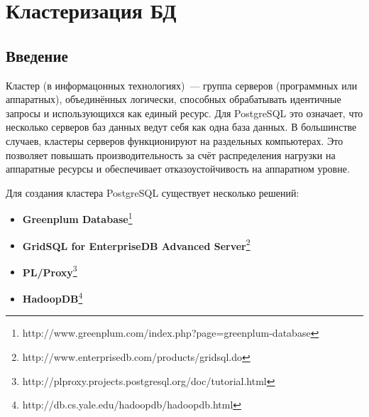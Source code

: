 \chapter{Кластеризация БД}
\section{Введение}
Кластер (в информацонных технологиях)~--- группа серверов (программных или аппаратных), объединённых логически, 
способных обрабатывать идентичные запросы и использующихся как единый ресурс. Для PostgreSQL это означает, что несколько серверов 
баз данных ведут себя как одна база данных. В большинстве случаев, кластеры серверов функционируют на раздельных компьютерах. 
Это позволяет повышать производительность за счёт распределения нагрузки на аппаратные ресурсы и обеспечивает отказоустойчивость 
на аппаратном уровне.

Для создания кластера PostgreSQL существует несколько решений:
\begin{itemize}
\item \textbf{Greenplum Database}\footnote{http://www.greenplum.com/index.php?page=greenplum-database}
\item \textbf{GridSQL for EnterpriseDB Advanced Server}\footnote{http://www.enterprisedb.com/products/gridsql.do}
\item \textbf{PL/Proxy}\footnote{http://plproxy.projects.postgresql.org/doc/tutorial.html}
\item \textbf{HadoopDB}\footnote{http://db.cs.yale.edu/hadoopdb/hadoopdb.html}
\end{itemize}